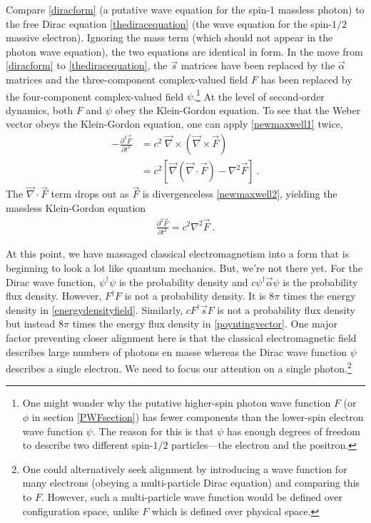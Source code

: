 \documentclass[12pt,secnumarabic,amsmath,amssymb,balancelastpage,nofootinbib]{article}
\newcommand{\del}[0]{\ensuremath{\vec{\nabla}}}
\begin{document}
Compare \eqref{diracform} (a putative wave equation for the spin-1 massless photon) to the free Dirac equation \eqref{thediracequation} (the wave equation for the spin-$1/2$ massive electron).  Ignoring the mass term (which should not appear in the photon wave equation), the two equations are identical in form.  In the move from \eqref{diracform} to \eqref{thediracequation}, the $\vec{s}$ matrices have been replaced by the $\vec{\alpha}$ matrices and the three-component complex-valued field $F$ has been replaced by the four-component complex-valued field $\psi$.\footnote{One might wonder why the putative higher-spin photon wave function $F$ (or $\phi$ in section \ref{PWFsection}) has fewer components than the lower-spin electron wave function $\psi$.  The reason for this is that $\psi$ has enough degrees of freedom to describe two different spin-$1/2$ particles---the electron and the positron.}  At the level of second-order dynamics, both $F$ and $\psi$ obey the Klein-Gordon equation.  To see that the Weber vector obeys the Klein-Gordon equation, one can apply \eqref{newmaxwell1} twice,
\begin{align}
-\frac{\partial^2 \vec{F}}{\partial t^2}  &= c^2  \: \del \times (\del \times \vec{F})
\nonumber
\\
&=c^2 \left[ \del(\del\cdot\vec{F})-\nabla^2 \vec{F} \right]
\ .
\label{derivingKG}
\end{align}
The $\del\cdot\vec{F}$ term drops out as $\vec{F}$ is divergenceless \eqref{newmaxwell2}, yielding the massless Klein-Gordon equation
\begin{align}
\frac{\partial^2 \vec{F}}{\partial t^2}  = c^2  \nabla^2 \vec{F}
\ .
\label{photonKG}
\end{align}

At this point, we have massaged classical electromagnetism into a form that is beginning to look a lot like quantum mechanics.  But, we're not there yet.  For the Dirac wave function, $\psi^\dagger \psi$ is the probability density and $c \psi^\dagger \vec{\alpha} \psi$ is the probability flux density.  However, $F^{\dagger}F$ is not a probability density.  It is $8\pi$ times the energy density in \eqref{energydensityfield}.  Similarly, $c F^\dagger \vec{s} F$ is not a probability flux density but instead $8\pi$ times the energy flux density in \eqref{poyntingvector}.  One major factor preventing closer alignment here is that the classical electromagnetic field describes large numbers of photons en masse whereas the Dirac wave function $\psi$ describes a single electron.  We need to focus our attention on a single photon.\footnote{One could alternatively seek alignment by introducing a wave function for many electrons (obeying a multi-particle Dirac equation) and comparing this to $F$.  However, such a multi-particle wave function would be defined over configuration space, unlike $F$ which is defined over physical space.}
\end{document}
